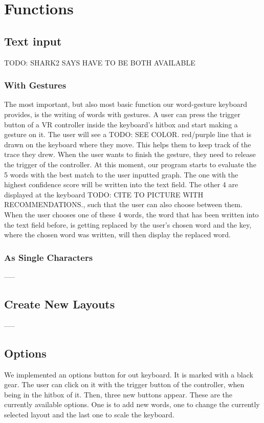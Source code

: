 \section{Functions}
\subsection{Text input}
TODO: SHARK2 SAYS HAVE TO BE BOTH AVAILABLE
\subsubsection{With Gestures}
The most important, but also most basic function our word-gesture keyboard provides, is the writing of words with gestures. A user can press the trigger button of a VR controller inside the keyboard's hitbox and start making a gesture on it. The user will see a TODO: SEE COLOR. red/purple line that is drawn on the keyboard where they move. This helps them to keep track of the trace they drew. When the user wants to finish the gesture, they need to release the trigger of the controller. At this moment, our program starts to evaluate the 5 words with the best match to the user inputted graph. The one with the highest confidence score will be written into the text field. The other 4 are displayed at the keyboard TODO: CITE TO PICTURE WITH RECOMMENDATIONS., such that the user can also choose between them. When the user chooses one of these 4 words, the word that has been written into the text field before, is getting replaced by the user's chosen word and the key, where the chosen word was written, will then display the replaced word.\\
\subsubsection{As Single Characters}
-----
\subsection{Create New Layouts}
-----
\subsection{Options}
We implemented an options button for out keyboard. It is marked with a black gear. The user can click on it with the trigger button of the controller, when being in the hitbox of it. Then, three new buttons appear. These are the currently available options. One is to add new words, one to change the currently selected layout and the last one to scale the keyboard.
